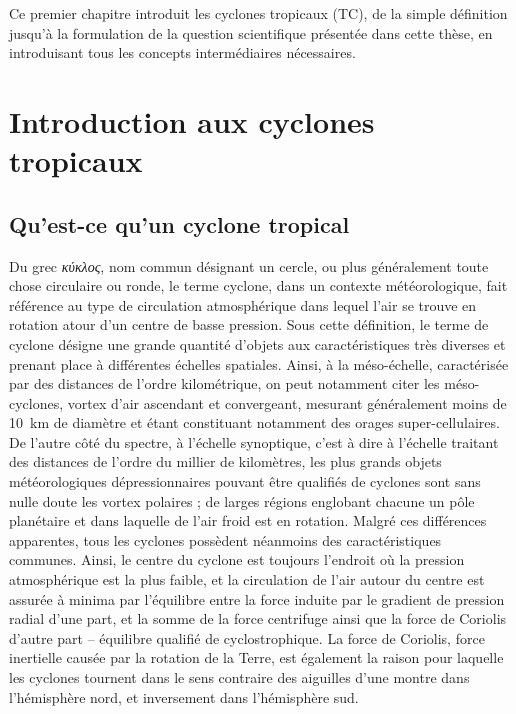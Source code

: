 \documentclass[../main.tex]{subfiles}
\begin{document}
\begin{itshape}
Ce premier chapitre introduit les cyclones tropicaux (TC), de la simple définition jusqu'à la formulation de la question scientifique présentée dans cette thèse, en introduisant tous les concepts intermédiaires nécessaires.
\end{itshape}

\minitoc
\section{Introduction aux cyclones tropicaux}

\subsection{Qu'est-ce qu'un cyclone tropical}

Du grec \textit{κύκλος}, nom commun désignant un cercle, ou plus généralement toute chose circulaire ou ronde, le terme cyclone, dans un contexte météorologique, fait référence au type de circulation atmosphérique dans lequel l'air se trouve en rotation atour d'un centre de basse pression. Sous cette définition, le terme de cyclone désigne une grande quantité d'objets aux caractéristiques très diverses et prenant place à différentes échelles spatiales. Ainsi, à la
méso-échelle, caractérisée par des distances de l'ordre kilométrique, on peut notamment citer les méso-cyclones, vortex d'air ascendant et convergeant, mesurant généralement moins de \SI{10}{\kilo\metre} de diamètre et étant constituant notamment des orages super-cellulaires. De l'autre côté du spectre, à l'échelle synoptique, c'est à dire à l'échelle traitant des distances de l'ordre du millier de kilomètres, les plus grands objets météorologiques dépressionnaires pouvant être qualifiés de cyclones sont sans
nulle doute les vortex polaires ; de larges régions englobant chacune un pôle planétaire et dans laquelle de l'air froid est en rotation. Malgré ces différences apparentes, tous les cyclones possèdent néanmoins des caractéristiques communes. Ainsi, le centre du cyclone est toujours l'endroit où la pression atmosphérique est la plus faible, et la circulation de l'air autour du centre est assurée à minima par l'équilibre entre la force induite par le gradient de pression radial d'une part, et la somme
de la force centrifuge ainsi que la force de Coriolis d'autre part -- équilibre qualifié de cyclostrophique. La force de Coriolis, force inertielle causée par la rotation de la Terre, est également la raison pour laquelle les cyclones tournent dans le sens contraire des aiguilles d'une montre dans l'hémisphère nord, et inversement dans l'hémisphère sud.
\end{document}
